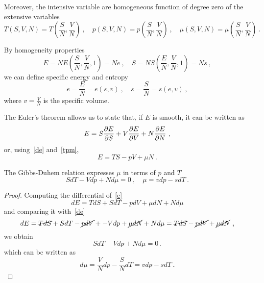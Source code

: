     Moreover, the intensive variable are homogeneous function of degree zero of the extensive variables 
    \begin{equation}\label{a5}
        T(S, V, N) = T(\frac{S}{N}, \frac{V}{N}) ~, \quad p(S, V, N) = p(\frac{S}{N}, \frac{V}{N}) ~, \quad \mu(S, V, N) = \mu(\frac{S}{N}, \frac{V}{N}) ~.
    \end{equation}

    By homogeneity properties 
    \begin{equation*}
        E = N E (\frac{S}{N}, \frac{V}{N}, 1) = N e ~, \quad  S = N S(\frac{E}{N}, \frac{V}{N}, 1) = N s ~,
    \end{equation*}
    we can define specific energy and entropy 
    \begin{equation*}
        e = \frac{E}{N} = e(s, v) ~, \quad s = \frac{S}{N} = s(e, v) ~,
    \end{equation*}
    where $v = \frac{V}{N}$ is the specific volume.

    The Euler's theorem allows us to state that, if $E$ is smooth, it can be written as 
    \begin{equation*}
        E = S \frac{\partial E}{\partial S} + V \frac{\partial E}{\partial V} + N \frac{\partial E}{\partial N} ~,
    \end{equation*}
    or, using~\eqref{de} and~\eqref{tpm}, 
    \begin{equation}\label{e}
        E = TS - pV + \mu N ~.
    \end{equation}

    The Gibbs-Duhem relation expresses $\mu$ in terms of $p$ and $T$ 
    \begin{equation}\label{gdrel}
        S dT - Vdp + N d\mu = 0 ~, \quad \mu = v dp - s dT ~.
    \end{equation}
    \begin{proof}
        Computing the differential of~\eqref{e} 
        \begin{equation*}
            dE = T dS + S dT -p dV + \mu dN + N d\mu 
        \end{equation*}
        and comparing it with~\eqref{de}
        \begin{equation*}
            dE = \cancel{T dS} + S dT - \cancel{p dV} + - V dp + \cancel{\mu dN} + N d\mu = \cancel{T dS} - \cancel{p dV} + \cancel{\mu dN} ~,
        \end{equation*}
        we obtain 
        \begin{equation*}
            S dT - V dp + N d\mu = 0 ~.
        \end{equation*}
        which can be written as 
        \begin{equation*}
            d \mu = \frac{V}{N} dp - \frac{S}{N} dT = v dp - s dT ~.
        \end{equation*}
    \end{proof}


